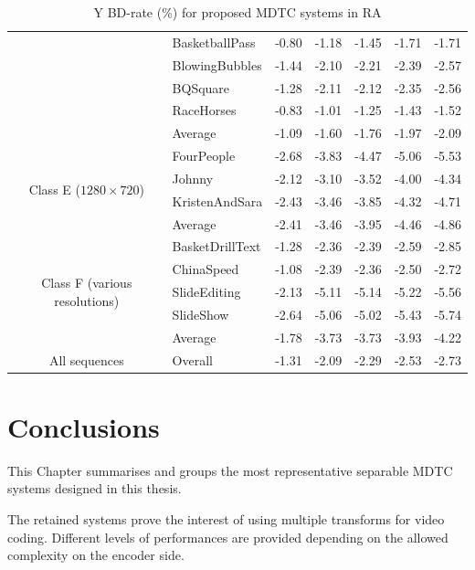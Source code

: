 \documentclass[11pt,a4paper,openright,twoside]{book}
\numberwithin{equation}{section} %
\numberwithin{figure}{section} %
\numberwithin{table}{section} %
\begin{document}
\begin{table}[tb]
\begin{tabularx}{\textwidth}{c|X|r|rrrr}
		& BasketballPass         & -0.80 & -1.18 & -1.45 & -1.71 & -1.71 \\
		& BlowingBubbles         & -1.44 & -2.10 & -2.21 & -2.39 & -2.57 \\
		& BQSquare               & -1.28 & -2.11 & -2.12 & -2.35 & -2.56 \\
		& RaceHorses             & -0.83 & -1.01 & -1.25 & -1.43 & -1.52 \\
		\cline{2-7} &
		Average                  & -1.09 & -1.60 & -1.76 & -1.97 & -2.09 \\
		\hline
		\hline
		\multirow{4}{2cm}{\centering Class E ($1280\times720$)}
		& FourPeople             & -2.68 & -3.83 & -4.47 & -5.06 & -5.53 \\
		& Johnny                 & -2.12 & -3.10 & -3.52 & -4.00 & -4.34 \\
		& KristenAndSara         & -2.43 & -3.46 & -3.85 & -4.32 & -4.71 \\
		\cline{2-7} &
		Average                  & -2.41 & -3.46 & -3.95 & -4.46 & -4.86 \\
		\hline
		\hline
		\multirow{5}{2cm}{\centering Class F (various resolutions)}
		& BasketDrillText        & -1.28 & -2.36 & -2.39 & -2.59 & -2.85 \\
		& ChinaSpeed             & -1.08 & -2.39 & -2.36 & -2.50 & -2.72 \\
		& SlideEditing           & -2.13 & -5.11 & -5.14 & -5.22 & -5.56 \\
		& SlideShow              & -2.64 & -5.06 & -5.02 & -5.43 & -5.74 \\
		\cline{2-7} &
		Average                  & -1.78 & -3.73 & -3.73 & -3.93 & -4.22 \\
		\hline
		\hline
		All sequences &
		Overall                  & -1.31 & -2.09 & -2.29 & -2.53 & -2.73 \\
	\end{tabularx}
	\caption{Y \acs{BD}-rate (\%) for proposed \acs{MDTC} systems in \acs{RA}}
	\label{tab:final_systems_ra}
\end{table}

\section{Conclusions}
\label{sec:summary_conclusions}

This Chapter summarises and groups the most representative separable \ac{MDTC}
systems designed in this thesis.

The retained systems prove the interest of using multiple transforms for video
coding.
Different levels of performances are provided depending on the allowed
complexity on the encoder side.
\end{document}
